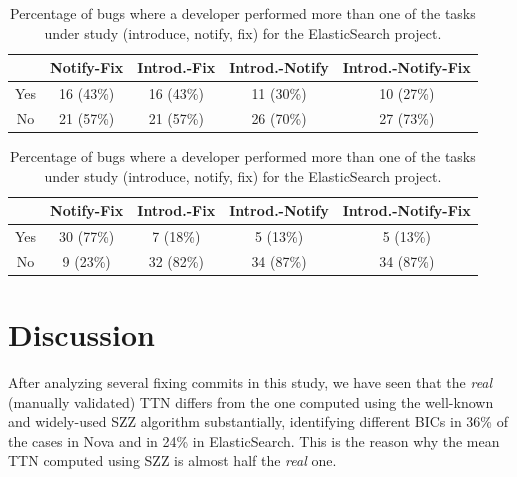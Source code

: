 \documentclass[10pt, conference]{IEEEtran}
\begin{document}
\begin{table}[!t]
\renewcommand{\arraystretch}{1.3}
\centering
\caption{Percentage of bugs where a developer performed more than one of the tasks under study (introduce, notify, fix) for the ElasticSearch project.}
\label{tableII}
\begin{tabular}{|c||c||c||c||c| }
\hline
  & Notify-Fix & Introd.-Fix & Introd.-Notify &  Introd.-Notify-Fix \\
\hline
Yes & 16 (43\%) & 16 (43\%) & 11 (30\%) & 10 (27\%) \\
\hline
No & 21 (57\%) & 21 (57\%) & 26 (70\%) & 27 (73\%) \\
\hline
\end{tabular}
\end{table}

\begin{table}[!t]
\renewcommand{\arraystretch}{1.3}
\centering
\caption{Percentage of bugs where a developer performed more than one of the tasks under study (introduce, notify, fix) for the ElasticSearch project.}
\label{tableIII}
\begin{tabular}{|c||c||c||c||c| }
\hline
  & Notify-Fix & Introd.-Fix & Introd.-Notify & Introd.-Notify-Fix \\
\hline
Yes & 30 (77\%) & 7 (18\%) & 5 (13\%) & 5 (13\%) \\
\hline
No & 9 (23\%) & 32 (82\%) & 34 (87\%) &  34 (87\%) \\
\hline
\end{tabular}
\end{table}



\section{Discussion}
\label{sec:discussion}

After analyzing several fixing commits in this study, we have seen that the \emph{real} (manually validated) TTN differs from the one computed using the well-known and widely-used SZZ algorithm substantially, identifying different BICs in 36\% of the cases in Nova and in 24\% in ElasticSearch. This is the reason why the mean TTN computed using SZZ is almost half the \emph{real} one. %
\end{document}
